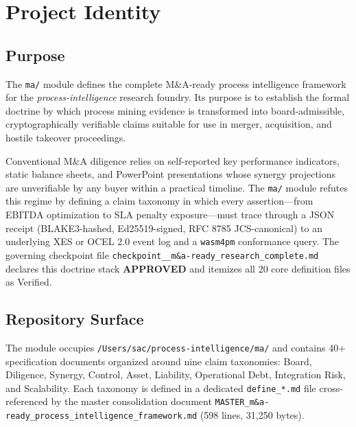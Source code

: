 
\section{Project Identity}
\label{sec:ma-identity}

\subsection{Purpose}
\label{sec:ma-identity-purpose}

The \texttt{ma/} module defines the complete M\&A-ready process intelligence framework for the
\textit{process-intelligence} research foundry. Its purpose is to establish the formal doctrine
by which process mining evidence is transformed into board-admissible, cryptographically verifiable
claims suitable for use in merger, acquisition, and hostile takeover proceedings.

Conventional M\&A diligence relies on self-reported key performance indicators, static balance
sheets, and PowerPoint presentations whose synergy projections are unverifiable by any buyer
within a practical timeline. The \texttt{ma/} module refutes this regime by defining a
claim taxonomy in which every assertion---from EBITDA optimization to SLA penalty
exposure---must trace through a JSON receipt (BLAKE3-hashed, Ed25519-signed, RFC 8785
JCS-canonical) to an underlying XES or OCEL 2.0 event log and a \texttt{wasm4pm}
conformance query. The governing checkpoint file
\texttt{checkpoint\_\_m\&a-ready\_research\_complete.md} declares this doctrine stack
\textbf{APPROVED} and itemizes all 20 core definition files as Verified.

\subsection{Repository Surface}
\label{sec:ma-identity-surface}

The module occupies \texttt{/Users/sac/process-intelligence/ma/} and contains 40+ specification
documents organized around nine claim taxonomies: Board, Diligence, Synergy, Control, Asset,
Liability, Operational Debt, Integration Risk, and Scalability. Each taxonomy is defined in a
dedicated \texttt{define\_*.md} file cross-referenced by the master consolidation document
\texttt{MASTER\_m\&a-ready\_process\_intelligence\_framework.md} (598 lines, 31,250 bytes).

